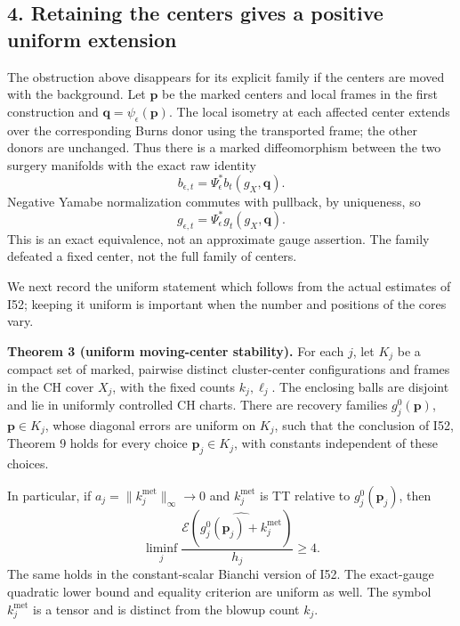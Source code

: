 \documentclass[
  11pt,
]{article}
\begin{document}
\hypertarget{retaining-the-centers-gives-a-positive-uniform-extension}{%
\subsection{4. Retaining the centers gives a positive uniform
extension}\label{retaining-the-centers-gives-a-positive-uniform-extension}}

The obstruction above disappears for its explicit family if the centers
are moved with the background. Let \(\mathbf p\) be the marked centers
and local frames in the first construction and
\(\mathbf q=\psi_\epsilon(\mathbf p)\). The local isometry at each
affected center extends over the corresponding Burns donor using the
transported frame; the other donors are unchanged. Thus there is a
marked diffeomorphism between the two surgery manifolds with the exact
raw identity \[
 b_{\epsilon,t}
     =\Psi_\epsilon^*b_t(g_X,\mathbf q).                       \tag{4.1}
\] Negative Yamabe normalization commutes with pullback, by uniqueness,
so \[
 g_{\epsilon,t}
     =\Psi_\epsilon^*g_t(g_X,\mathbf q).                       \tag{4.2}
\] This is an exact equivalence, not an approximate gauge assertion. The
family defeated a fixed center, not the full family of centers.

We next record the uniform statement which follows from the actual
estimates of I52; keeping it uniform is important when the number and
positions of the cores vary.

\textbf{Theorem 3 (uniform moving-center stability).} For each \(j\),
let \(K_j\) be a compact set of marked, pairwise distinct cluster-center
configurations and frames in the CH cover \(X_j\), with the fixed counts
\(k_j,\ell_j\). The enclosing balls are disjoint and lie in uniformly
controlled CH charts. There are recovery families \(g_j^0(\mathbf p)\),
\(\mathbf p\in K_j\), whose diagonal errors are uniform on \(K_j\), such
that the conclusion of I52, Theorem 9 holds for every choice
\(\mathbf p_j\in K_j\), with constants independent of these choices.

In particular, if \(a_j=\|k_j^{\mathrm{met}}\|_\infty\to0\) and
\(k_j^{\mathrm{met}}\) is TT relative to \(g_j^0(\mathbf p_j)\), then \[
 \liminf_j
 \frac{\mathcal E\!\left(\widehat{g_j^0(\mathbf p_j)
                                    +k_j^{\mathrm{met}}}\right)}
      {h_j}\ge4.                                             \tag{4.3}
\] The same holds in the constant-scalar Bianchi version of I52. The
exact-gauge quadratic lower bound and equality criterion are uniform as
well. The symbol \(k_j^{\mathrm{met}}\) is a tensor and is distinct from
the blowup count \(k_j\).
\end{document}
